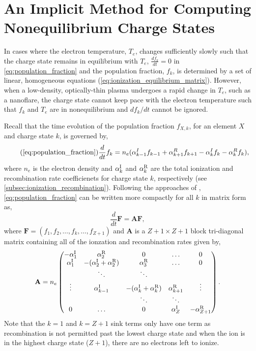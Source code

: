 \chapter{An Implicit Method for Computing Nonequilibrium Charge States}\label{ap:nonequilibrium_implicit}

 In cases where the electron temperature, $T_e$, changes sufficiently slowly such that the charge state remains in equilibrium with $T_e$, $\frac{df_k}{dt}=0$ in \autoref{eq:population_fraction} and the population fraction, $f_k$, is determined by a set of linear, homogeneous equations (\autoref{eq:ionization_equilibrium_matrix}). However, when a low-density, optically-thin plasma undergoes a rapid change in $T_e$, such as a nanoflare, the charge state cannot keep pace with the electron temperature such that $f_k$ and $T_e$ are in nonequilibrium and $df_k/dt$ cannot be ignored. 
 
 Recall that the time evolution of the population fraction $f_{X,k}$, for an element $X$ and charge state $k$, is governed by,
 \begin{equation*}\tag{\ref{eq:population_fraction}}
     \frac{d}{dt}f_k = n_e(\alpha_{k-1}^I f_{k-1} + \alpha_{k+1}^R f_{k+1} - \alpha_{k}^I f_k - \alpha_k^R f_k),
 \end{equation*}
 where $n_e$ is the electron density and $\alpha^\textup{I}_k$ and $\alpha^\textup{R}_k$ are the total ionization and recombination rate coefficienets for charge state $k$, respectively (see \autoref{subsec:ionization_recombination}). Following the approaches of \citet{masai_x-ray_1984,hughes_self-consistent_1985}, \autoref{eq:population_fraction} can be written more compactly for all $k$ in matrix form as,
 \begin{equation}\label{eq:population_fraction_matrix}
     \frac{d}{dt}\mathbf{F} = \mathbf{A}\mathbf{F},
 \end{equation}
 where $\mathbf{F}=(f_1,f_2,\ldots,f_k,\ldots,f_{Z+1})$ and $\mathbf{A}$ is a $Z+1{\times}Z+1$ block tri-diagonal matrix containing all of the ionzation and recombination rates given by,
 \begin{equation}\label{eq:rate_matrix}
    \mathbf{A} = n_e
        \begin{pmatrix}
            -\alpha^\textup{I}_1 & \alpha^\textup{R}_2 & 0 & \dots & 0 \\
            \alpha^\textup{I}_1 & -(\alpha^\textup{I}_2 + \alpha^\textup{R}_2) & \alpha^\textup{R}_3 & \dots & 0 \\
             & \ddots & \ddots & &  \\
            \vdots & \alpha^\textup{I}_{k-1} & -(\alpha^\textup{I}_k + \alpha^\textup{R}_k) & \alpha^\textup{R}_{k+1} & \vdots \\
             & & \ddots & \ddots & \\
            0 & \dots & 0 & \alpha^\textup{I}_{Z} & -\alpha^\textup{R}_{Z+1} 
        \end{pmatrix}.
\end{equation}
Note that the $k=1$ and $k=Z+1$ sink terms only have one term as recombination is not permitted past the lowest charge state and when the ion is in the highest charge state ($Z+1$), there are no electrons left to ionize.

